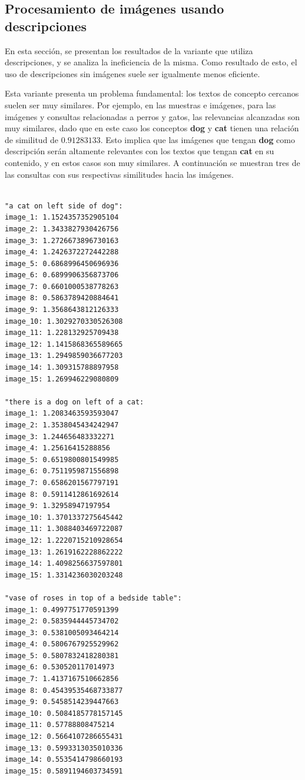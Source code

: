 \subsection{Procesamiento de im\'agenes usando descripciones}
En esta sección, se presentan los resultados de la variante que utiliza descripciones, y se analiza la ineficiencia de la misma. Como resultado de esto, el uso de descripciones sin im\'agenes suele ser igualmente menos eficiente.

Esta variante presenta un problema fundamental: los textos de concepto cercanos suelen ser muy similares. Por ejemplo, en las muestras e im\'agenes, para las im\'agenes y consultas relacionadas a perros y gatos, las relevancias alcanzadas son muy similares, dado que en este caso los conceptos \textbf{dog} y \textbf{cat} tienen una relación de similitud de $0.91283133$. Esto implica que las im\'agenes que tengan \textbf{dog} como descripción ser\'an altamente relevantes con los textos que tengan \textbf{cat} en su contenido, y en estos casos son muy similares. A continuaci\'on se muestran tres de las consultas con sus respectivas similitudes hacia las im\'agenes.

\begin{verbatim}

"a cat on left side of dog":
image_1: 1.1524357352905104
image_2: 1.3433827930426756
image_3: 1.2726673896730163
image_4: 1.2426372272442288
image_5: 0.6868996450696936
image_6: 0.6899906356873706
image_7: 0.6601000538778263
image 8: 0.5863789420884641
image_9: 1.3568643812126333
image_10: 1.3029270330526308
image_11: 1.228132925709438
image_12: 1.1415868365589665
image_13: 1.2949859036677203
image_14: 1.309315788897958
image_15: 1.269946229080809

"there is a dog on left of a cat:
image_1: 1.2083463593593047
image_2: 1.3538045434242947
image_3: 1.244656483332271
image_4: 1.25616415288856
image_5: 0.6519800801549985
image_6: 0.7511959871556898
image_7: 0.6586201567797191
image 8: 0.5911412861692614
image_9: 1.32958947197954
image_10: 1.3701337275645442
image_11: 1.3088403469722087
image_12: 1.2220715210928654
image_13: 1.2619162228862222
image_14: 1.4098256637597801
image_15: 1.3314236030203248

"vase of roses in top of a bedside table":
image_1: 0.4997751770591399
image_2: 0.5835944445734702
image_3: 0.5381005093464214
image_4: 0.5806767925529962
image_5: 0.5807832418280381
image_6: 0.530520117014973
image_7: 1.4137167510662856
image 8: 0.45439535468733877
image_9: 0.5458514239447663
image_10: 0.5084185778157145
image_11: 0.57788808475214
image_12: 0.5664107286655431
image_13: 0.5993313035010336
image_14: 0.5535414798660193
image_15: 0.5891194603734591

\end{verbatim}


